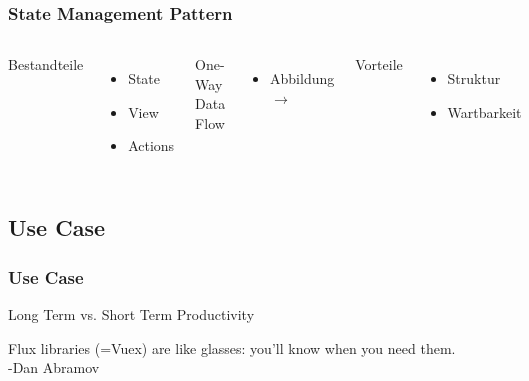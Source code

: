 \documentclass{beamer}
\begin{document}
\begin{frame}
    \frametitle{State Management Pattern}
    \begin{columns}
        Bestandteile
        \begin{itemize}
            \item State
            \item View
            \item Actions
        \end{itemize}
        One-Way Data Flow
        \begin{itemize}
            \item Abbildung $\rightarrow$
        \end{itemize}
        Vorteile
        \begin{itemize}
            \item Struktur
            \item Wartbarkeit
        \end{itemize}
        \includegraphics[scale=0.2]{pattern.png}
    \end{columns}
\end{frame}
\subsection{Use Case}
\begin{frame}
    \frametitle{Use Case}
    \begin{block}{Long Term vs. Short Term Productivity}
        \begin{center}
            Flux libraries (=Vuex) are like glasses: you’ll know when you need them.
            \\-Dan Abramov

        \end{center}
    \end{block}
\end{frame}
\end{document}
